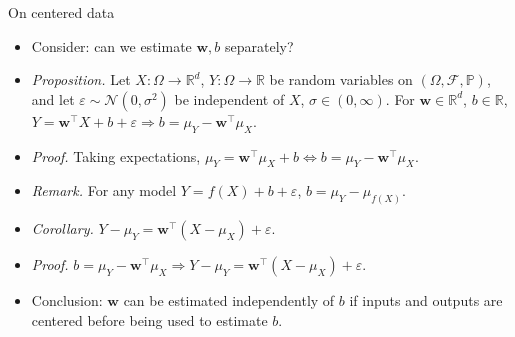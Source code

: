 \documentclass{beamer}
\numberwithin{equation}{section}
\begin{document}
\begin{frame}{On centered data}
    \begin{itemize}
        \item
        Consider: can we estimate $ \mathbf{w}, b $ separately?

        \item
        \textit{Proposition.} Let $ X : \Omega \rightarrow \mathbb{R}^d $,
        $ Y : \Omega \rightarrow \mathbb{R} $ be random variables on
        $ (\Omega, \mathcal{F}, \mathbb{P}) $, and let $ \varepsilon \sim
        \mathcal{N}(0, \sigma^2) $ be independent of $ X $, $ \sigma \in
        (0, \infty) $. For $ \mathbf{w} \in \mathbb{R}^d $,
        $ b \in \mathbb{R} $,
        $ Y = \mathbf{w}^\top X + b + \varepsilon \Rightarrow b = \mu_Y -
        \mathbf{w}^\top\mu_X $.

        \item
        \textit{Proof.} Taking expectations, $ \mu_Y = \mathbf{w}^\top\mu_X +
        b \Leftrightarrow b = \mu_Y - \mathbf{w}^\top\mu_X $.

        \item
        \textit{Remark.} For any model $ Y = f(X) + b + \varepsilon $,
        $ b = \mu_Y - \mu_{f(X)} $.

        \item
        \textit{Corollary.} $ Y - \mu_Y = \mathbf{w}^\top(X - \mu_X) +
        \varepsilon $.

        \item
        \textit{Proof.} $ b = \mu_Y - \mathbf{w}^\top\mu_X \Rightarrow
        Y - \mu_Y = \mathbf{w}^\top(X - \mu_X) + \varepsilon $.

        \item
        Conclusion: $ \mathbf{w} $ can be estimated independently of $ b $ if
        inputs and outputs are centered before being used to estimate $ b $.
    \end{itemize}        
\end{frame}
\end{document}
